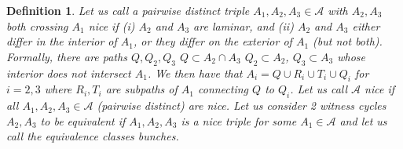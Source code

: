 \documentclass[letterpaper,11pt]{article}
\newtheorem{definition}[theorem]{Definition}
\newcommand{\0}{\mathbb{0}}
\newcommand{\1}{\mathbb{1}}
\begin{document}
\begin{definition}
Let us call a pairwise distinct triple $A_1, A_2, A_3 \in \mathcal{A}$ with $A_2, A_3$ both crossing $A_1$  \emph{nice}  
if (i) $A_2$ and $A_3$ are laminar, and (ii) $A_2$ and $A_3$ either differ in the interior of $A_1$, or they differ on the exterior of $A_1$ (but not both).
Formally, there are paths $Q,Q_2,Q_3$ $Q \subset A_2 \cap A_3 $ $ Q_2 \subset A_2 $, $Q_3 \subset A_3 $ whose interior does not intersect $A_1$. We then have that $A_i = Q \cup R_i \cup T_i \cup Q_i$ for $i=2,3$ where $R_i, T_i$ are subpaths of $A_1$ connecting $Q$ to $Q_i$.   
Let us call $\mathcal{A}$ nice if all $A_1,A_2,A_3 \in \mathcal{A}$ (pairwise distinct) are nice.  Let us consider 2 witness cycles $A_2, A_3$ to be equivalent if $A_1, A_2, A_3$ is a nice triple for some $A_1 \in \mathcal{A}$ and let us call the equivalence classes bunches.
\end{definition}
\end{document}
